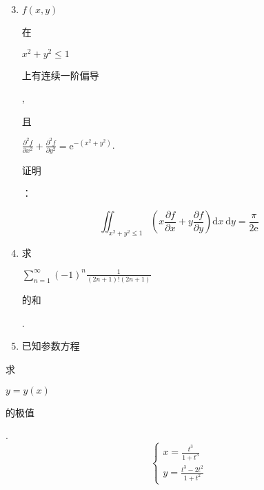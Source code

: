 \documentclass[10pt]{article}
\begin{document}
\begin{enumerate}
  \setcounter{enumi}{2}
  \item $f(x, y)$ \begin{CJK}{UTF8}{mj}在\end{CJK} $x^{2}+y^{2} \leq 1$ \begin{CJK}{UTF8}{mj}上有连续一阶偏导\end{CJK}, \begin{CJK}{UTF8}{mj}且\end{CJK} $\frac{\partial^{2} f}{\partial x^{2}}+\frac{\partial^{2} f}{\partial y^{2}}=\mathrm{e}^{-\left(x^{2}+y^{2}\right)}$. \begin{CJK}{UTF8}{mj}证明\end{CJK}：
\end{enumerate}
$$
\iint_{x^{2}+y^{2} \leq 1}\left(x \frac{\partial f}{\partial x}+y \frac{\partial f}{\partial y}\right) \mathrm{d} x \mathrm{~d} y=\frac{\pi}{2 \mathrm{e}}
$$

\begin{enumerate}
  \setcounter{enumi}{3}
  \item \begin{CJK}{UTF8}{mj}求\end{CJK} $\sum_{n=1}^{\infty}(-1)^{n} \frac{1}{(2 n+1) !(2 n+1)}$ \begin{CJK}{UTF8}{mj}的和\end{CJK}.

  \item \begin{CJK}{UTF8}{mj}已知参数方程\end{CJK}

\end{enumerate}
\begin{CJK}{UTF8}{mj}求\end{CJK} $y=y(x)$ \begin{CJK}{UTF8}{mj}的极值\end{CJK}.
$$
\left\{\begin{array}{l}
x=\frac{t^{3}}{1+t^{3}} \\
y=\frac{t^{3}-2 t^{2}}{1+t^{2}}
\end{array}\right.
$$
\end{document}
